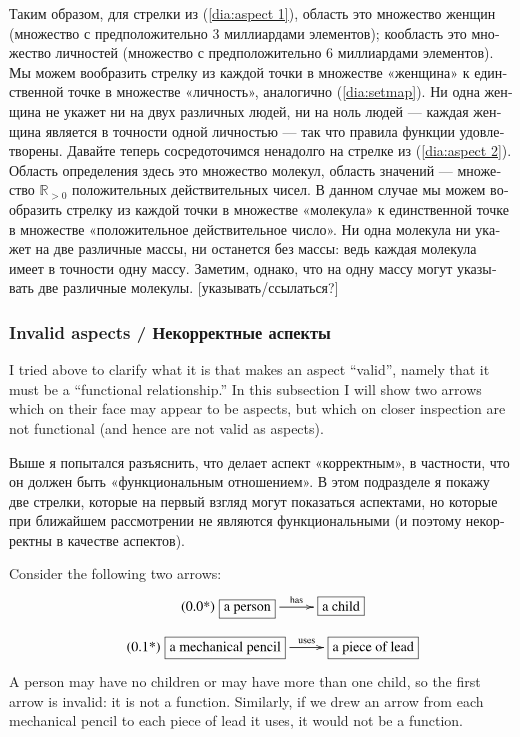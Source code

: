 \documentclass[a4paper]{book}
\def\tn{\textnormal}
\def\RR{{\mathbb R}}
\newcommand{\LA}[2]{\ar[#1]^-{\tn {#2}}}
\theoremstyle{myth}
\begin{document}
\begin{russian}
Таким образом, для стрелки из (\ref{dia:aspect 1}), область это множество женщин (множество с предположительно 3 миллиардами элементов); кообласть это множество личностей (множество с предположительно 6 миллиардами элементов).  Мы можем вообразить стрелку из каждой точки в множестве «женщина» к единственной точке в множестве «личность», аналогично (\ref{dia:setmap}).  Ни одна женщина не укажет ни на двух различных людей, ни на ноль людей — каждая женщина является в точности одной личностью — так что правила функции удовлетворены.  Давайте теперь сосредоточимся ненадолго на стрелке из (\ref{dia:aspect 2}).  Область определения здесь это множество молекул, область значений — множество $\RR_{>0}$ положительных действительных чисел.  В данном случае мы можем вообразить стрелку из каждой точки в множестве «молекула» к единственной точке в множестве «положительное действительное число».  Ни одна молекула ни укажет на две различные массы, ни останется без массы: ведь каждая молекула имеет в точности одну массу.  Заметим, однако, что на одну массу могут указывать две различные молекулы. [указывать/ссылаться?] 


\subsubsection{Invalid aspects / Некорректные аспекты}\label{sec:invalid aspect}

I tried above to clarify what it is that makes an aspect “valid”, namely that it must be a “functional relationship.”  In this subsection I will show two arrows which on their face may appear to be aspects, but which on closer inspection are not functional (and hence are not valid as aspects).  
 
Выше я попытался разъяснить, что делает аспект «корректным», в частности, что он должен быть «функциональным отношением».  В этом подразделе я покажу две стрелки, которые на первый взгляд могут показаться аспектами, но которые при ближайшем рассмотрении не являются функциональными (и поэтому некорректны в качестве аспектов).   

Consider the following two arrows:
\begin{align}\tag{\arabic{subsection}.\arabic{equation}*}\addtocounter{equation}{1}\label{dia:invalid 1}
\xymatrixnocompile{\fbox{a person}\LA{r}{has}&\fbox{a child}}
\end{align}
\vspace{-.13in}
\begin{align}\tag{\arabic{subsection}.\arabic{equation}*}\addtocounter{equation}{1}\label{dia:invalid 2}
\xymatrixnocompile{\fbox{a mechanical pencil}\LA{r}{uses}&\fbox{a piece of lead}}
\end{align}  
A person may have no children or may have more than one child, so the first arrow is invalid: it is not a function.  Similarly, if we drew an arrow from each mechanical pencil to each piece of lead it uses, it would not be a function.


\end{russian}
\end{document}
